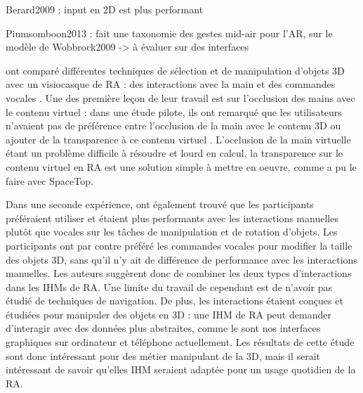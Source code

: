 Berard2009 : input en 2D est plus performant

Piumsomboon2013 : fait une taxonomie des gestes mid-air pour l'AR, sur le modèle de Wobbrock2009 -> à évaluer sur des interfaces

\cite{Piumsomboon2014} ont comparé différentes techniques de sélection et de manipulation d'objets 3D avec un visiocasque de RA : des interactions avec la main et des commandes vocales . Une des première leçon de leur travail est sur l'occlusion des mains avec le contenu virtuel : dans une étude pilote, ils ont remarqué que les utilisateurs n'avaient pas de préférence entre l'occlusion de la main avec le contenu 3D ou ajouter de la transparence à ce contenu virtuel . L'occlusion de la main virtuelle étant un problème difficile à résoudre et lourd en calcul, la transparence sur le contenu virtuel en RA est une solution simple à mettre en oeuvre, comme a pu le faire \cite{Lee2013} avec SpaceTop.


Dans une seconde expérience, \citeauthor{Piumsomboon2014} ont également trouvé que les participants préféraient utiliser et étaient plus performants avec les interactions manuelles plutôt que vocales sur les tâches de manipulation et de rotation d'objets. Les participants ont par contre préféré les commandes vocales pour modifier la taille des objets 3D, sans qu'il n'y ait de différence de performance avec les interactions manuelles. Les auteurs suggèrent donc de combiner les deux types d'interactions dans les IHMs de RA. Une limite du travail de \citeauthor{Piumsomboon2014} cependant est de n'avoir pas étudié de techniques de navigation. De plus, les interactions étaient conçues et étudiées pour manipuler des objets en 3D : une IHM de RA peut demander d'interagir avec des données plus abstraites, comme le sont nos interfaces graphiques sur ordinateur et téléphone actuellement. Les résultats de cette étude sont donc intéressant pour des métier manipulant de la 3D, mais il serait intéressant de savoir qu'elles IHM seraient adaptée pour un usage quotidien de la RA.

